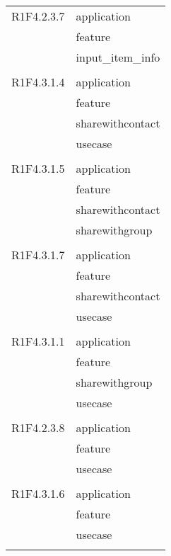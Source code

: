 \begin{center}
\begin{longtable}{|p{7cm}|p{7cm}|}
		R1F4.2.3.7 & application \\ & feature \\ & input\_item\_info \\ & \\ \hline
		R1F4.3.1.4 & application \\ & feature \\ & sharewithcontact \\ & usecase \\ & \\ \hline
		R1F4.3.1.5 & application \\ & feature \\ & sharewithcontact \\ & sharewithgroup \\ & \\ \hline
		R1F4.3.1.7 & application \\ & feature \\ & sharewithcontact \\ & usecase \\ & \\ \hline
		R1F4.3.1.1 & application \\ & feature \\ & sharewithgroup \\ & usecase \\ & \\ \hline
		R1F4.2.3.8 & application \\ & feature \\ & usecase \\ & \\ \hline
		R1F4.3.1.6 & application \\ & feature \\ & usecase \\ & \\ \hline
	\end{longtable}
\end{center}
